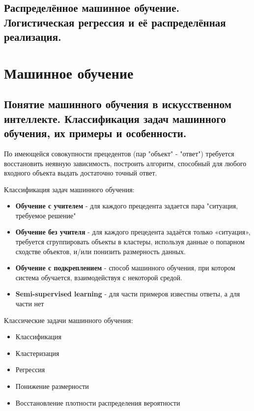 \documentclass{article}
\begin{document}
\subsection{Распределённое машинное обучение. Логистическая регрессия и её
распределённая реализация.}




% 

\section{Машинное обучение}

\subsection{Понятие машинного обучения в искусственном интеллекте. Классификация задач
машинного обучения, их примеры и особенности.}


По имеющейся совокупности прецедентов (пар "объект" - "ответ") требуется
восстановить неявную зависимость, построить алгоритм, способный для любого
входного объекта выдать достаточно точный ответ.

Классификация задач машинного обучения:
\begin{itemize}
    \item \textbf{Обучение с учителем} - для каждого прецедента задается пара "ситуация, требуемое решение"
    \item \textbf{Обучение без учителя} - для каждого прецедента задаётся только
    «ситуация», требуется сгруппировать объекты в кластеры, используя данные
    о попарном сходстве объектов, и/или понизить размерность данных.
    \item \textbf{Обучение с подкреплением} - способ машинного обучения, при котором
    система обучается, взаимодействуя с некоторой средой.
    \item \textbf{Semi-supervised learning} - для части примеров известны ответы, а для части нет
\end{itemize}

Классические задачи машинного обучения:
\begin{itemize}
    \item Классификация
    \item Кластеризация
    \item Регрессия
    \item Понижение размерности
    \item Восстановление плотности распределения вероятности
\end{itemize}
\end{document}
